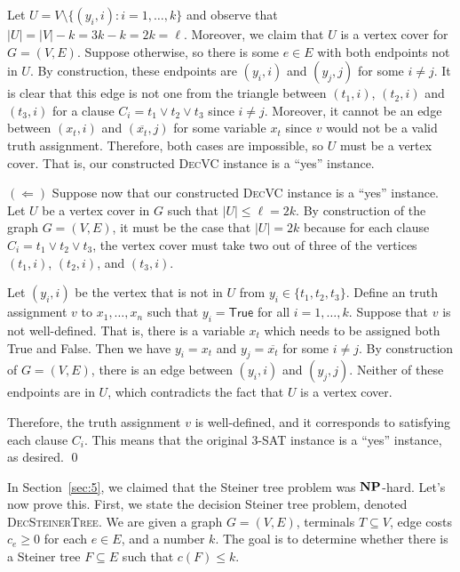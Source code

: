 \begin{pf}
    Let $U = V \setminus \{(y_i, i) : i = 1, \dots, k\}$ and observe that 
    $|U| = |V| - k = 3k - k = 2k = \ell$. Moreover, we claim that $U$ is a 
    vertex cover for $G = (V, E)$. Suppose otherwise, so there is some $e \in E$ 
    with both endpoints not in $U$. By construction, these endpoints are 
    $(y_i, i)$ and $(y_j, j)$ for some $i \neq j$. It is clear that 
    this edge is not one from the triangle between $(t_1, i)$, $(t_2, i)$
    and $(t_3, i)$ for a clause $C_i = t_1 \vee t_2 \vee t_3$ since $i \neq j$.
    Moreover, it cannot be an edge between $(x_t, i)$ and $(\overline{x_t}, j)$ 
    for some variable $x_t$ since $v$ would not be a valid truth assignment.
    Therefore, both cases are impossible, so $U$ must be a vertex cover. 
    That is, our constructed \textsc{DecVC} instance is a ``yes'' instance.

    $(\Leftarrow)$ Suppose now that our constructed \textsc{DecVC} instance 
    is a ``yes'' instance. Let $U$ be a vertex cover in $G$ such that 
    $|U| \leq \ell = 2k$. By construction of the graph $G = (V, E)$, 
    it must be the case that $|U| = 2k$ because for each clause 
    $C_i = t_1 \vee t_2 \vee t_3$, the vertex cover must take two 
    out of three of the vertices $(t_1, i)$, $(t_2, i)$, and $(t_3, i)$. 

    Let $(y_i, i)$ be the vertex that is not in $U$ from $y_i \in 
    \{t_1, t_2, t_3\}$. Define an truth assignment $v$ to $x_1, \dots, x_n$ 
    such that $y_i = \textsf{True}$ for all $i = 1, \dots, k$. Suppose that 
    $v$ is not well-defined. That is, there is a variable $x_t$ which 
    needs to be assigned both \textsf{True} and \textsf{False}. 
    Then we have $y_i = x_t$ and $y_j = \overline{x_t}$ for some $i \neq j$. 
    By construction of $G = (V, E)$, there is an edge between $(y_i, i)$ 
    and $(y_j, j)$. Neither of these endpoints are in $U$, which 
    contradicts the fact that $U$ is a vertex cover.

    Therefore, the truth assignment $v$ is well-defined, and it corresponds 
    to satisfying each clause $C_i$. This means that the original 
    \textsc{3-SAT} instance is a ``yes'' instance, as desired. \qed 
\end{pf}\vspace{-0.25cm}
In Section~\ref{sec:5}, we claimed that the Steiner tree problem 
was $\mathbf{NP}$-hard. Let's now prove this. First, we state the 
decision Steiner tree problem, denoted \textsc{DecSteinerTree}. 
We are given a graph $G = (V, E)$, terminals $T \subseteq V$, 
edge costs $c_e \geq 0$ for each $e \in E$, and a number $k$. 
The goal is to determine whether there is a Steiner tree $F \subseteq E$ 
such that $c(F) \leq k$. 

